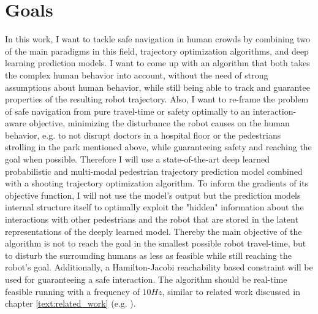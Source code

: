 \section{Goals}
\label{text:introduction/goals}
In this work, I want to tackle safe navigation in human crowds by combining two of the main paradigms in this field, trajectory optimization algorithms, and deep learning prediction models. I want to come up with an algorithm that both takes the complex human behavior into account, without the need of strong assumptions about human behavior, while still being able to track and guarantee properties of the resulting robot trajectory. Also, I want to re-frame the problem of safe navigation from pure travel-time or safety optimally to an interaction-aware objective, minimizing the disturbance the robot causes on the human behavior, e.g. to not disrupt doctors in a hospital floor or the pedestrians strolling in the park mentioned above, while guaranteeing safety and reaching the goal when possible.
\newline
Therefore I will use a state-of-the-art deep learned probabilistic and multi-modal pedestrian trajectory prediction model combined with a shooting trajectory optimization algorithm. To inform the gradients of its objective function, I will not use the model's output but the prediction models internal structure itself to optimally exploit the "hidden" information about the interactions with other pedestrians and the robot that are stored in the latent representations of the deeply learned model. Thereby the main objective of the algorithm is not to reach the goal in the smallest possible robot travel-time, but to disturb the surrounding humans as less as feasible while still reaching the robot's goal. Additionally, a Hamilton-Jacobi reachability based constraint will be used for guaranteeing a safe interaction. The algorithm should be real-time feasible running with a frequency of $10 Hz$, similar to related work discussed in chapter \ref{text:related_work} (e.g. \cite{Chen2017}).
